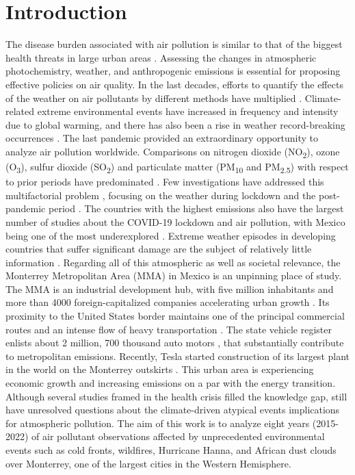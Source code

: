 \documentclass[preprint,12pt]{elsarticle}
\begin{document}
\section{Introduction}
The disease burden associated with air pollution is similar to that of the biggest health threats in large urban areas \citep{organization2021}. Assessing the changes in atmospheric photochemistry, weather, and anthropogenic emissions is essential for proposing effective policies on air quality. In the last decades, efforts to quantify the effects of the weather on air pollutants by different methods have multiplied \citep{Zhang_2017,Shrestha_2022,Gong_2022,Ni_2023}. Climate-related extreme environmental events have increased in frequency and intensity due to global warming, and there has also been a rise in weather record-breaking occurrences \citep{Ni_2023,Clarke_2022,Swain_2020}. The last pandemic provided an extraordinary opportunity to analyze air pollution worldwide. Comparisons on nitrogen dioxide (NO\textsubscript{2}), ozone (O\textsubscript{3}), sulfur dioxide (SO\textsubscript{2}) and particulate matter (PM\textsubscript{10} and PM\textsubscript{2.5}) with respect to prior periods have predominated \citep{Kumari_2020,Bao2020,Berman_2020,Saha_2022,Han_2022}. Few investigations have addressed this multifactorial problem \citep{Sokhi2021,Bontempi_2022}, focusing on the weather during lockdown and the post-pandemic period \citep{Hernandez-Paniagua2021,ZORAN,Priya,Agrawal_2024}. The countries with the highest emissions also have the largest number of studies about the COVID-19 lockdown and air pollution, with Mexico being one of the most underexplored \citep{Aboagye}. Extreme weather episodes in developing countries that suffer significant damage are the subject of relatively little information \citep{Otto_2020}. Regarding all of this atmospheric as well as societal relevance, the Monterrey Metropolitan Area (MMA) in Mexico is an unpinning place of study. The MMA is an industrial development hub, with five million inhabitants and more than 4000 foreign-capitalized companies accelerating urban growth \citep{20152018}. Its proximity to the United States border maintains one of the principal commercial routes and an intense flow of heavy transportation \citep{cmm2019}. The state vehicle register enlists about 2 million, 700 thousand auto motors \citep{len}, that substantially contribute to metropolitan emissions. Recently, Tesla started construction of its largest plant in the world on the Monterrey outskirts \citep{tesla_2023}. This urban area is experiencing economic growth and increasing emissions on a par with the energy transition. Although several studies framed in the health crisis filled the knowledge gap, still have unresolved questions about the climate-driven atypical events implications for atmospheric pollution. The aim of this work is to analyze eight years (2015-2022) of air pollutant observations affected by unprecedented environmental events such as cold fronts, wildfires, Hurricane Hanna, and African dust clouds over Monterrey, one of the largest cities in the Western Hemisphere.
\end{document}
